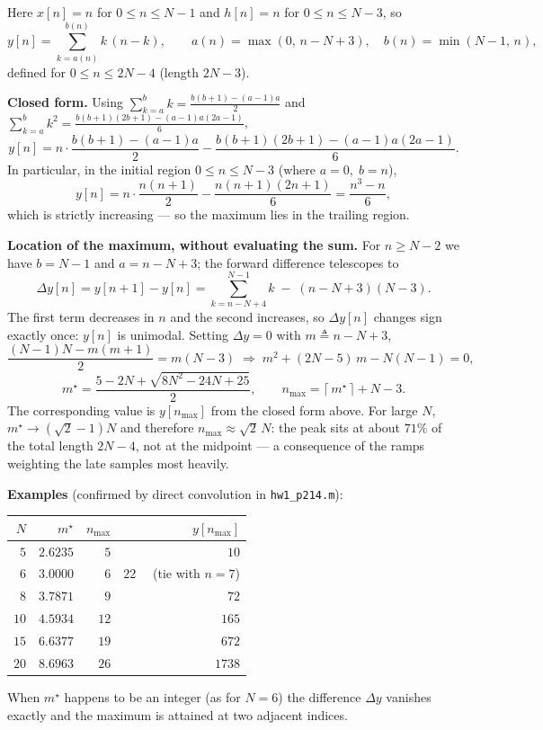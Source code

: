 
Here $x[n]=n$ for $0\le n\le N-1$ and $h[n]=n$ for $0\le n\le N-3$, so
\[
y[n]=\sum_{k=a(n)}^{b(n)}k\,(n-k),\qquad a(n)=\max(0,\,n-N+3),\quad b(n)=\min(N-1,\,n),
\]
defined for $0\le n\le 2N-4$ (length $2N-3$).

\textbf{Closed form.} Using $\sum_{k=a}^{b}k=\tfrac{b(b+1)-(a-1)a}{2}$ and
$\sum_{k=a}^{b}k^{2}=\tfrac{b(b+1)(2b+1)-(a-1)a(2a-1)}{6}$,
\[
y[n]=n\cdot\frac{b(b+1)-(a-1)a}{2}-\frac{b(b+1)(2b+1)-(a-1)a(2a-1)}{6}.
\]
In particular, in the initial region $0\le n\le N-3$ (where $a=0,\;b=n$),
\[
y[n]=n\cdot\frac{n(n+1)}{2}-\frac{n(n+1)(2n+1)}{6}=\frac{n^{3}-n}{6},
\]
which is strictly increasing --- so the maximum lies in the trailing region.

\textbf{Location of the maximum, without evaluating the sum.} For $n\ge N-2$ we have
$b=N-1$ and $a=n-N+3$; the forward difference telescopes to
\[
\Delta y[n]=y[n+1]-y[n]=\sum_{k=n-N+4}^{N-1}k\;-\;(n-N+3)(N-3).
\]
The first term decreases in $n$ and the second increases, so $\Delta y[n]$ changes sign
exactly once: $y[n]$ is unimodal. Setting $\Delta y=0$ with $m\triangleq n-N+3$,
\[
\frac{(N-1)N-m(m+1)}{2}=m(N-3)
\;\Longrightarrow\;
m^{2}+(2N-5)\,m-N(N-1)=0,
\]
\[
\boxed{\;m^\star=\frac{5-2N+\sqrt{8N^{2}-24N+25}}{2},\qquad
n_{\max}=\bigl\lceil\, m^\star\,\bigr\rceil+N-3 .\;}
\]
The corresponding value is $y[n_{\max}]$ from the closed form above. For large $N$,
$m^\star\to(\sqrt2-1)N$ and therefore $n_{\max}\approx\sqrt{2}\,N$: the peak sits at about
$71\%$ of the total length $2N-4$, not at the midpoint --- a consequence of the ramps
weighting the late samples most heavily.

\textbf{Examples} (confirmed by direct convolution in \texttt{hw1\_p214.m}):
\begin{center}
\renewcommand{\arraystretch}{1.15}
\begin{tabular}{@{}rrrr@{}}
\toprule
$N$ & $m^\star$ & $n_{\max}$ & $y[n_{\max}]$\\
\midrule
$5$ & $2.6235$ & $5$ & $10$\\
$6$ & $3.0000$ & $6$ & $22$ \ \ (tie with $n=7$)\\
$8$ & $3.7871$ & $9$ & $72$\\
$10$ & $4.5934$ & $12$ & $165$\\
$15$ & $6.6377$ & $19$ & $672$\\
$20$ & $8.6963$ & $26$ & $1738$\\
\bottomrule
\end{tabular}
\end{center}
When $m^\star$ happens to be an integer (as for $N=6$) the difference $\Delta y$ vanishes
exactly and the maximum is attained at two adjacent indices.

